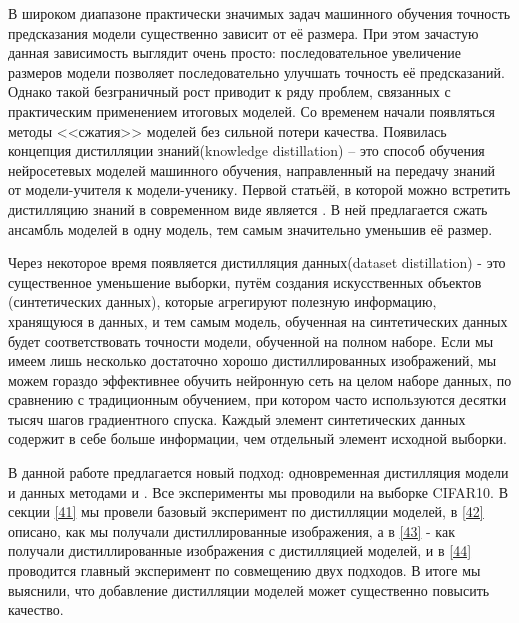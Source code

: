 \documentclass[12pt]{article}
\begin{document}
В широком диапазоне практически значимых задач машинного обучения точность предсказания модели существенно зависит от её размера. При этом зачастую данная зависимость выглядит очень просто: последовательное увеличение размеров модели позволяет последовательно улучшать точность её предсказаний. Однако такой безграничный рост приводит к ряду проблем, связанных с практическим применением итоговых моделей. Со временем начали появляться методы <<сжатия>> моделей без сильной потери качества. Появилась концепция дистилляции знаний(knowledge distillation) – это способ обучения нейросетевых моделей машинного обучения, направленный на передачу знаний от модели-учителя к модели-ученику. Первой статьёй, в которой можно встретить дистилляцию знаний в современном виде является \cite{hinton2015distilling}. В ней предлагается сжать ансамбль моделей в одну модель, тем самым значительно уменьшив её размер.

Через некоторое время появляется дистилляция данных(dataset distillation) - это существенное уменьшение выборки, путём создания искусственных объектов (синтетических данных), которые агрегируют полезную информацию, хранящуюся в данных, и тем самым модель, обученная на синтетических данных будет соответствовать точности модели, обученной на полном наборе. Если мы имеем лишь несколько достаточно хорошо дистиллированных изображений, мы можем гораздо эффективнее обучить нейронную сеть на целом наборе данных, по сравнению с традиционным обучением, при котором часто используются десятки тысяч шагов градиентного спуска. Каждый элемент синтетических данных содержит в себе больше информации, чем отдельный элемент исходной выборки. 

В данной работе предлагается новый подход: одновременная дистилляция модели и данных методами \cite{hinton2015distilling} и     \cite{cazenavette2022dataset}. Все эксперименты мы проводили на выборке CIFAR10. В секции \ref{41} мы провели базовый эксперимент по дистилляции моделей, в \ref{42} описано, как мы получали дистиллированные изображения, а в \ref{43} - как получали дистиллированные изображения с дистилляцией моделей, и в \ref{44} проводится главный эксперимент по совмещению двух подходов. В итоге мы выяснили, что добавление дистилляции моделей может существенно повысить качество.
\end{document}
